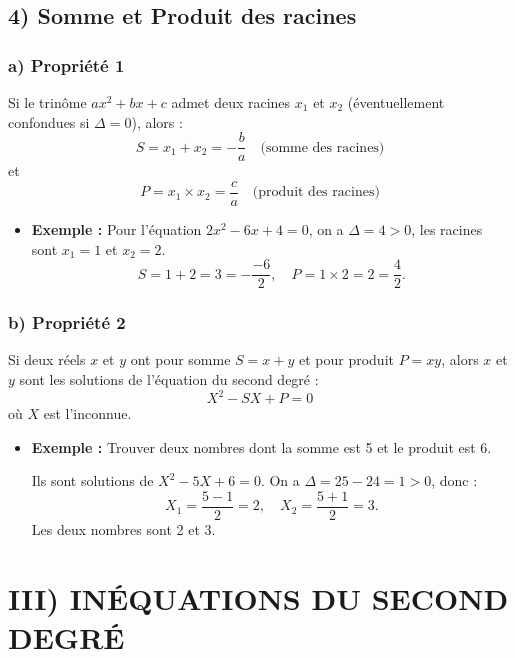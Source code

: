 \documentclass[12pt,a4paper]{article}
\newcounter{solution}
\begin{document}
\subsection*{\color{myred} 4) Somme et Produit des racines}

\subsubsection*{\color{myred} a) Propriété 1}
Si le trinôme $ax^2 + bx + c$ admet deux racines $x_1$ et $x_2$ (éventuellement confondues si $\Delta = 0$), alors :
\[
S = x_1 + x_2 = -\dfrac{b}{a} \quad \text{(somme des racines)}
\]
et
\[
P = x_1 \times x_2 = \dfrac{c}{a} \quad \text{(produit des racines)}
\]

\begin{itemize}
    \item \textbf{Exemple :} Pour l'équation $2x^2 - 6x + 4 = 0$, on a $\Delta = 4 > 0$, les racines sont $x_1 = 1$ et $x_2 = 2$.
    \[
    S = 1+2 = 3 = -\dfrac{-6}{2}, \quad P = 1 \times 2 = 2 = \dfrac{4}{2}.
    \]
\end{itemize}

\subsubsection*{\color{myred} b) Propriété 2}
Si deux réels $x$ et $y$ ont pour somme $S = x + y$ et pour produit $P = xy$, alors $x$ et $y$ sont les solutions de l'équation du second degré :
\[
X^2 - SX + P = 0
\]
où $X$ est l'inconnue.

\begin{itemize}
    \item \textbf{Exemple :} Trouver deux nombres dont la somme est 5 et le produit est 6.
    
    Ils sont solutions de $X^2 - 5X + 6 = 0$.
    On a $\Delta = 25 - 24 = 1 > 0$, donc :
    \[
    X_1 = \dfrac{5 - 1}{2} = 2, \quad X_2 = \dfrac{5 + 1}{2} = 3.
    \]
    Les deux nombres sont 2 et 3.
\end{itemize}


\section*{\color{myred} III) INÉQUATIONS DU SECOND DEGRÉ}
\end{document}

